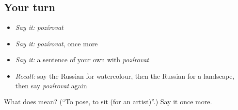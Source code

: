 \subsection*{Your turn}
\begin{itemize}
\raggedright
  \item \emph{Say it:} \emph{pozírovat}
  \item \emph{Say it:} \emph{pozírovat}, once more
  \item \emph{Say it:} a sentence of your own with \emph{pozírovat}
  \item \emph{Recall:} say the Russian for watercolour, then the Russian for a landscape, then say \emph{pozírovat} again
\end{itemize}

\begin{tcolorbox}[breakable,colback=teal!4,colframe=teal!35!black,title={Before you move on}]
What does  mean? (\textquotedblleft{}To pose, to sit (for an artist)\textquotedblright{}.) Say it once more.
\end{tcolorbox}
